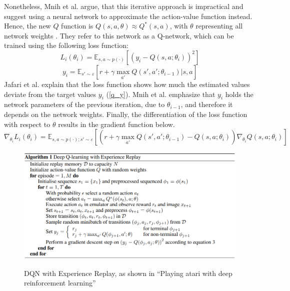 Nonetheless, Mnih et al. argue, that this iterative approach is impractical and suggest using a neural network to approximate the action-value function instead. Hence, the new $Q$ function is $Q(s,a,\theta)\approx Q^*(s,a)$, with $\theta$ representing all network weights \cite{jaja19}. They refer to this network as a Q-network, which can be trained using the following loss function:
\begin{equation}\label{q_loss}
    L_i(\theta_i) = \mathbb{E}_{s,a \sim p(\cdot)} \left[ (y_i - Q(s,a;\theta_i))^2 \right]
\end{equation}
\begin{equation}\label{q_y}
    y_i = \mathbb{E}_{s' \sim \varepsilon } \left[ r + \gamma \max_{a'} Q(s',a'; \theta_{i-1}) | s,a \right]
\end{equation}
Jafari et al. \cite{jaja19} explain that the loss function shows how much the estimated values deviate from the target values $y_i$ (\ref{q_y}). Mnih et al. emphasize that $y_i$ holds the network parameters of the previous iteration, due to $\theta_{i-1}$, and therefore it depends on the network weights. Finally, the differentiation of the loss function with respect to $\theta$ results in the gradient function below.
\begin{equation}\label{q_gradient}
    \nabla_{\theta_i} L_i(\theta_i) = \mathbb{E}_{s,a \sim p(\cdot);s' \sim \varepsilon } \left[\left( r + \gamma \max_{a'} Q(s',a'; \theta_{i-1}) - Q(s,a;\theta_i) \right) \nabla_{\theta_i} Q(s,a;\theta_i) \right]
\end{equation}
\begin{figure}[hpbt]
    \centering
    \includegraphics[width=1\textwidth]{pictures/dqn_algo_code.png}\\
    \caption[DQN with Experience Replay]{DQN with Experience Replay, as shown in ``Playing atari with deep reinforcement learning''\cite{mnka13}}\label{fig:dqn_algo_code}
\end{figure}